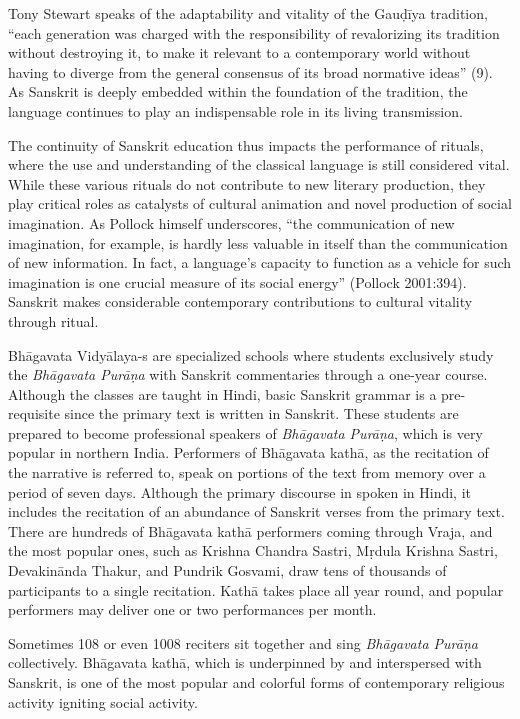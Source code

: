 Tony Stewart speaks of the adaptability and vitality of the Gauḍīya tradition, “each generation was charged with the responsibility of revalorizing its tradition without destroying it, to make it relevant to a contemporary world without having to diverge from the general consensus of its broad normative ideas” (9). As Sanskrit is deeply embedded within the foundation of the tradition, the language continues to play an indispensable role in its living transmission. 

The continuity of Sanskrit education thus impacts the performance of rituals, where the use and understanding of the classical language is still considered vital. While these various rituals do not contribute to new literary production, they play critical roles as catalysts of cultural animation and novel production of social imagination. As Pollock himself underscores, “the communication of new imagination, for example, is hardly less valuable in itself than the communication of new information. In fact, a language’s capacity to function as a vehicle for such imagination is one crucial measure of its social energy” (Pollock 2001:394). Sanskrit makes considerable contemporary contributions to cultural vitality through ritual. 

Bhāgavata Vidyālaya-s are specialized schools where students exclusively study the {\sl Bhāgavata Purāṇa} with Sanskrit commentaries through a one-year course. Although the classes are taught in Hindi, basic Sanskrit grammar is a pre-requisite since the primary text is written in Sanskrit. These students are prepared to become professional speakers of {\sl Bhāgavata Purāṇa}, which is very popular in northern India. Performers of Bhāgavata kathā, as the recitation of the narrative is referred to, speak on portions of the text from memory over a period of seven days. Although the primary discourse in spoken in Hindi, it includes the recitation of an abundance of Sanskrit verses from the primary text. There are hundreds of Bhāgavata kathā performers coming through Vraja, and the most popular ones, such as Krishna Chandra Sastri, Mṛdula Krishna Sastri, Devakinānda Thakur, and Pundrik Gosvami, draw tens of thousands of participants to a single recitation. Kathā takes place all year round, and popular performers may deliver one or two performances per month. 

Sometimes 108 or even 1008 reciters sit together and sing {\sl Bhāgavata Purāṇa} collectively. Bhāgavata kathā, which is underpinned by and interspersed with Sanskrit, is one of the most popular and colorful forms of contemporary religious activity igniting social activity. 

